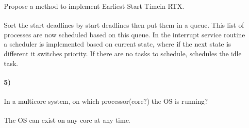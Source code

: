 \documentclass[12pt]{article}
\begin{document}
Propose a method to implement Earliest Start Timein RTX.\\\\
Sort the start deadlines by start deadlines then put them in a queue. This 
list of processes are now scheduled based on this queue. In the interrupt service 
routine a scheduler is implemented based on current state, where if the next state is 
different it switches priority. If there are no tasks to schedule, schedules the idle task.\\\\
\textbf{5)}\\\\
In a multicore system, on which processor(core?) the OS is running?\\\\
The OS can exist on any core at any time.
\end{document}

